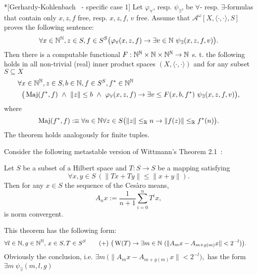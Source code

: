 \begin{thm}*[Gerhardy-Kohlenbach~\cite{GK08} - specific case 1]%
Let $\varphi_\forall$, resp. $\psi_\exists$, be $\forall$-
resp. $\exists$-formulas that contain only $x,z,f$ free, resp. $x,z,f$, $v$ free. Assume that
$\mathcal{A}^\omega[X,\langle\cdot,\cdot\rangle,S]$ proves the following sentence:
\[
\forall  x\in\NN^\NN, z\in S, f\in{S^S} 
	\big( \varphi_\forall(x, z, f)\rightarrow\exists v\in\NN\ \psi_\exists(x, z, f, v)\big).
\]
Then there is a computable functional $F : \mathbb{N}^{\mathbb{N}}\times\mathbb{N}\times\mathbb{N}^{\mathbb{N}}\to\mathbb{N}$ s. t. the following holds
in all non-trivial (real) inner product spaces $(X,\langle\cdot,\cdot\rangle)$ 
and for any subset $S\subseteq X$
\begin{align*}
\forall  &x\in\NN^\NN, z\in S, b\in\NN, f\in{S^S},f^*\in\NN^\NN\\
	&\big( \TMaj(f^*,f)\ \wedge\ \|z\|\leq b\ \wedge\ \varphi_\forall(x, z, f) \rightarrow 
	\exists v\leq F(x,b,f^*)\ \psi_\exists(x, z, f, v) \big),
\end{align*}
where %
\[
\operatorname{Maj}(f^*,f):\equiv \forall n\in\mathbb{N}\forall z\in S \big( \|z\|\leq_{\mathbb{R}} n \rightarrow \|f(z)\|\leq_{\mathbb{R}} f^*(n)\big).
\]
The theorem holds analogously for finite tuples. %
\end{thm}
Consider the following metastable version of Wittmann's Theorem 2.1~\cite{Wittmann90}:
\begin{thm} \label{t:W21}
Let $S$ be a subset of a Hilbert space and $T:S\to S$
be a mapping satisfying 
\[
\forall x,y\in S\ (\| Tx + Ty \| \leq \|x + y\|).\tag{$\TAN$}\label{e:W}
\]
Then for any $x\in S$ the sequence of the Ces{\`a}ro means,
\[
A_nx:=\frac{1}{n+1}\sum^{n}_{i=0} T^i x,
\]
is norm convergent.
\end{thm}
This theorem has the following form:
\begin{align*}
\forall l\in\mathbb{N},g\in\mathbb{N}^{\mathbb{N}}, &\ x\in S, T\in S^S \tag{+}\label{e:w21meta}  
\ \big( \operatorname{W}(T)\rightarrow 
	\exists m\in\mathbb{N} \ (\|A_mx-A_{m+g(m)}x\|< 2^{-l})\big). 
\end{align*}
Obviously the conclusion, i.e. 
$
\exists m\ \big( \|A_mx-A_{m+g(m)}x\| < 2^{-l}\big),
$
has the form $\exists m\ \psi_\exists(m,l,g)$ 
